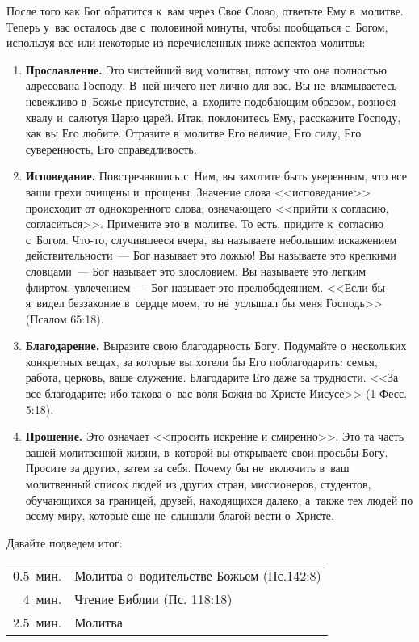 \documentclass[12pt,article,a4paper,fittopage]{ncc}
\begin{document}
\begin{multicols}{2}
После того как Бог обратится к~вам через Свое Слово, ответьте Ему в~молитве. Теперь у~вас осталось две с~половиной минуты, чтобы пообщаться с~Богом, используя все или некоторые из перечисленных ниже аспектов молитвы:
\begin{enumerate}
\item \textbf{Прославление.}  Это чистейший вид молитвы, потому что она полностью адресована Господу. В~ней ничего нет лично для вас. Вы не~вламываетесь невежливо в~Божье присутствие, а~входите подобающим образом, вознося хвалу и~салютуя Царю царей. Итак, поклонитесь Ему, расскажите Господу, как вы Его любите. Отразите в~молитве Его величие, Его силу, Его суверенность, Его справедливость.
\item \textbf{Исповедание.} Повстречавшись с~Ним, вы захотите быть уверенным, что все ваши грехи очищены и~прощены. Значение слова <<исповедание>> происходит от однокоренного слова, означающего <<прийти к согласию, согласиться>>. Примените это в~молитве. То есть, придите к~согласию с~Богом. Что-то, случившееся вчера, вы называете небольшим искажением действительности~--- Бог называет это ложью! Вы называете это крепкими словцами~--- Бог называет это злословием. Вы называете это легким флиртом, увлечением~--- Бог называет это прелюбодеянием. <<Если бы я~видел беззаконие в~сердце моем, то не~услышал бы меня Господь>> (Псалом 65:18).
\item \textbf{Благодарение.} Выразите свою благодарность Богу. Подумайте о~нескольких конкретных вещах, за которые вы хотели бы Его поблагодарить: семья, работа, церковь, ваше служение. Благодарите Его даже за трудности. <<За все благодарите: ибо такова о~вас воля Божия во Христе Иисусе>> (1 Фесс. 5:18).
\item \textbf{Прошение.} Это означает <<просить искренне и смиренно>>. Это та часть вашей молитвенной жизни, в~которой вы открываете свои просьбы Богу. Просите за других, затем за себя. Почему бы не~включить в~ваш молитвенный список людей из других стран, миссионеров, студентов, обучающихся за границей, друзей, находящихся далеко, а~также тех людей по всему миру, которые еще не~слышали благой вести о~Христе.
\end{enumerate}

Давайте подведем итог:
\vspace{0.3cm}

\begin{tabular}{ r p{5.4cm} }
  0.5\ мин. & Молитва о~водительстве Божьем (Пс.142:8)\\
    4\ мин. & Чтение Библии (Пс. 118:18) \\
  2.5\ мин. & Молитва 
\end{tabular}


\end{multicols}
\end{document}
